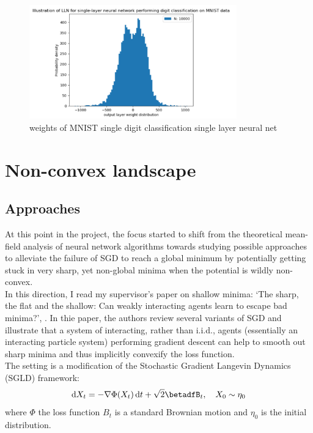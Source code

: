 \documentclass{article}
\begin{document}
\begin{figure}[H]
    \centering
    \includegraphics[width=0.8\textwidth]{images/Spiliopoulos2019-LLN-singleNN-mnist.png}
    \caption{weights of MNIST single digit classification single layer neural net}
    \label{fig: MNIST spiliopoulos}
\end{figure}

\section{Non-convex landscape}

\subsection{Approaches}

At this point in the project, the focus started to shift from the theoretical mean-field analysis of neural network algorithms towards studying possible approaches to alleviate the failure of SGD to reach a global minimum by potentially getting stuck in very sharp, yet non-global minima when the potential is wildly non-convex.\\ 

In this direction, I read my supervisor's paper on shallow minima: ‘The sharp, the flat and the shallow: Can weakly interacting agents learn to escape bad minima?’, \cite{kantas2019sharpflatshallowweakl}. In thie paper, the authors review several variants of SGD and illustrate that a system of interacting, rather than i.i.d., agents (essentially an interacting particle system) performing gradient descent can help to smooth out sharp minima and thus implicitly convexify
the loss function.\\ 

The setting is a modification of the Stochastic Gradient Langevin Dynamics (SGLD) framework:
\begin{equation}\label{eq: SGLD}
	\diff X_{t} = -\nabla \Phi(X_{t})\diff t + \sqrt{2}\betadfB_{t}, \quad X_{0}\sim \eta_{0}
\end{equation}
where $ \Phi$ the loss function $ B_{t}$ is a standard Brownian motion and $ \eta_{0}$ is the initial distribution.
\end{document}
